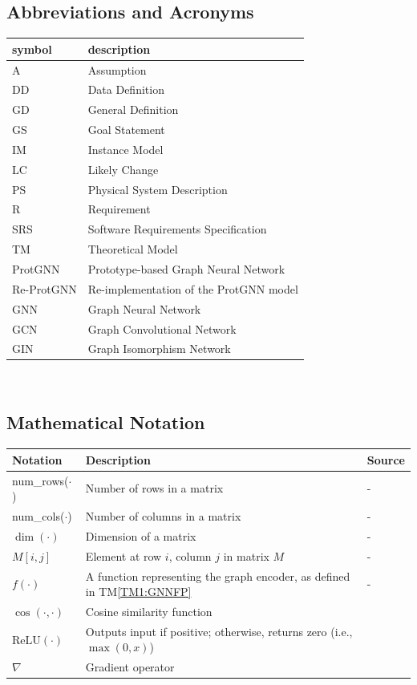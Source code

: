 \documentclass[12pt]{article}
\newcommand{\tref}[1]{TM\ref{#1}}
\begin{document}
\subsection{Abbreviations and Acronyms}

\renewcommand{\arraystretch}{1.2}
\begin{tabular}{l l} 
  \toprule		
  \textbf{symbol} & \textbf{description}\\
  \midrule 
  A & Assumption\\
  DD & Data Definition\\
  GD & General Definition\\
  GS & Goal Statement\\
  IM & Instance Model\\
  LC & Likely Change\\
  PS & Physical System Description\\
  R & Requirement\\
  SRS & Software Requirements Specification\\
  TM & Theoretical Model\\
  ProtGNN & Prototype-based Graph Neural Network\\
  Re-ProtGNN & Re-implementation of the ProtGNN model\\
  GNN & Graph Neural Network\\
  GCN & Graph Convolutional Network\\
  GIN & Graph Isomorphism Network\\
  \bottomrule
\end{tabular}\\


\subsection{Mathematical Notation}

\renewcommand{\arraystretch}{1.2}
\noindent \begin{longtable*}{l p{7cm} l} 
\toprule
\textbf{Notation} & \textbf{Description} & \textbf{Source} \\
\midrule 
num\_rows($\cdot$) & Number of rows in a matrix & - \\
num\_cols($\cdot$) & Number of columns in a matrix & -\\
$\dim(\cdot)$ & Dimension of a matrix & - \\
$M[i, j]$ & Element at row $i$, column $j$ in matrix $M$ & - \\
$f(\cdot)$ & A function representing the graph encoder, as defined in \tref{TM1:GNNFP} & - \\
$\cos(\cdot, \cdot)$ & Cosine similarity function & ~\citep{sciencedirect_cosine_similarity} \\
$\text{ReLU}(\cdot)$ & Outputs input if positive; otherwise, returns zero (i.e., $\max(0, x)$) & ~\citep{wikipedia_relu} \\
$\nabla$ & Gradient operator & ~\citep{wikipedia_gradient} \\
\bottomrule
\end{longtable*}
\end{document}
